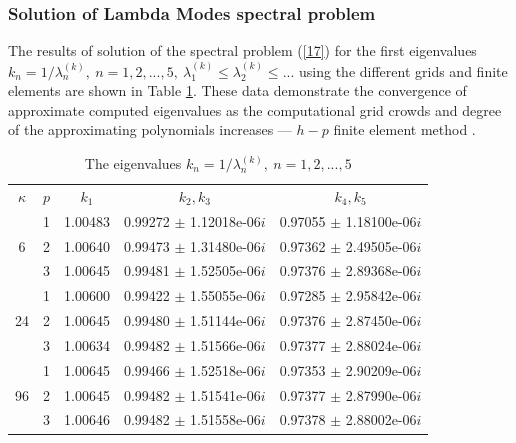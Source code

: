 \documentclass[authoryear]{elsarticle}
\begin{document}
\subsubsection{Solution of Lambda Modes spectral problem} 

The results of solution of the spectral problem (\ref{17})  for the first eigenvalues $k_n = 1 / \lambda_n^{(k)}, \ n = 1,2, ..., 5, \ \lambda_1^{(k)} \leq \lambda_2^{(k)} \leq ...$ 
using the different grids and finite elements are shown in Table \ref{t-2}. These data demonstrate the convergence of approximate computed eigenvalues as the computational grid crowds and degree of the approximating polynomials increases --- $h-p$ finite element method \cite{vidal2014solution}.

\begin{table}[htp]
\caption{The eigenvalues $k_n = 1 / \lambda_n^{(k)}, \ n = 1,2, ..., 5$}
\label{t-2}
\begin{center}
\begin{tabular}{ccccc}
\rowcolor{col1}
$\kappa$ & $p$ & $k_1$ &  $k_2, k_3$ &  $k_4,k_5$ \\ 
\rowcolor{col3}
   & 1 & 1.00483 & 0.99272 $\pm$ 1.12018e-06$i$  & 0.97055 $\pm$ 1.18100e-06$i$  \\
\rowcolor{col2}
 6 & 2 & 1.00640 & 0.99473 $\pm$ 1.31480e-06$i$  & 0.97362 $\pm$ 2.49505e-06$i$  \\
\rowcolor{col1}
   & 3 & 1.00645 & 0.99481 $\pm$ 1.52505e-06$i$  & 0.97376 $\pm$ 2.89368e-06$i$  \\
\rowcolor{col3}
   & 1 & 1.00600 & 0.99422 $\pm$ 1.55055e-06$i$  & 0.97285 $\pm$ 2.95842e-06$i$  \\
\rowcolor{col2}
24 & 2 & 1.00645 & 0.99480 $\pm$ 1.51144e-06$i$  & 0.97376 $\pm$ 2.87450e-06$i$  \\
\rowcolor{col1}
   & 3 & 1.00634 & 0.99482 $\pm$ 1.51566e-06$i$  & 0.97377 $\pm$ 2.88024e-06$i$  \\
\rowcolor{col3}
   & 1 & 1.00645 & 0.99466 $\pm$ 1.52518e-06$i$  & 0.97353 $\pm$ 2.90209e-06$i$  \\
\rowcolor{col2}
96 & 2 & 1.00645 & 0.99482 $\pm$ 1.51541e-06$i$  & 0.97377 $\pm$ 2.87990e-06$i$  \\
\rowcolor{col1}
   & 3 & 1.00646 & 0.99482 $\pm$ 1.51558e-06$i$  & 0.97378 $\pm$ 2.88002e-06$i$  \\
\end{tabular}
\end{center}
\end{table}
\end{document}
